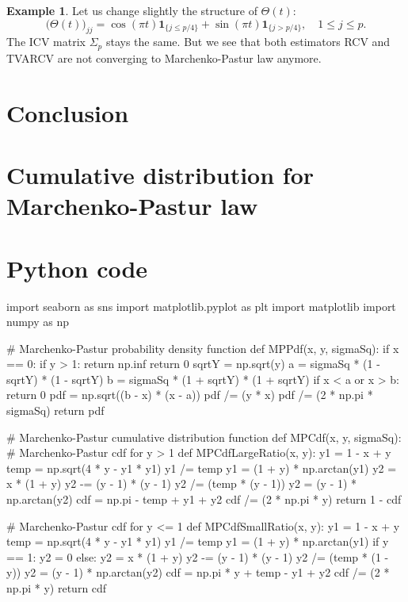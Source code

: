 \documentclass[a4paper,11pt]{article}
\theoremstyle{plain}
\theoremstyle{definition}
\newtheorem{exmp}[thm]{Example}
\begin{document}
    \begin{exmp}
    	Let us change slightly the structure of $\Theta(t)$:
    	\[ \Big(\Theta(t)\Big)_{jj} = \cos(\pi t) \mathbf{1}_{\{j \leq p/4\}} + \sin(\pi t) \mathbf{1}_{\{j > p/4\}}, \quad 1 \leq j \leq p.\]
    	The ICV matrix $\Sigma_p$ stays the same. But we see that both estimators RCV and TVARCV are not converging to Marchenko-Pastur law anymore.
    \end{exmp}
    
    \pagebreak
    \part{Conclusion}
    
    \pagebreak
    \begin{appendices}
    	\part*{Cumulative distribution for Marchenko-Pastur law}
    	
    	\pagebreak
    	\part*{Python code}
    	\begin{python}
import seaborn as sns
import matplotlib.pyplot as plt
import matplotlib
import numpy as np  
  		
    		
# Marchenko-Pastur probability density function
def MPPdf(x, y, sigmaSq):
    if x == 0:
        if y > 1:
            return np.inf
        return 0
    sqrtY = np.sqrt(y)
    a = sigmaSq * (1 - sqrtY) * (1 - sqrtY)
    b = sigmaSq * (1 + sqrtY) * (1 + sqrtY)
    if x < a or x > b:
        return 0
    pdf = np.sqrt((b - x) * (x - a))
    pdf /= (y * x)
    pdf /= (2 * np.pi * sigmaSq)
    return pdf


# Marchenko-Pastur cumulative distribution function
def MPCdf(x, y, sigmaSq):
    # Marchenko-Pastur cdf for y > 1
    def MPCdfLargeRatio(x, y):
        y1 = 1 - x + y
        temp = np.sqrt(4 * y - y1 * y1)
        y1 /= temp
        y1 = (1 + y) * np.arctan(y1)
        y2 = x * (1 + y)
        y2 -= (y - 1) * (y - 1)
        y2 /= (temp * (y - 1))
        y2 = (y - 1) * np.arctan(y2)
        cdf = np.pi - temp + y1 + y2
        cdf /= (2 * np.pi * y)
        return 1 - cdf

    # Marchenko-Pastur cdf for y <= 1
    def MPCdfSmallRatio(x, y):
        y1 = 1 - x + y
        temp = np.sqrt(4 * y - y1 * y1)
        y1 /= temp
        y1 = (1 + y) * np.arctan(y1)
        if y == 1:
            y2 = 0
        else:
            y2 = x * (1 + y)
            y2 -= (y - 1) * (y - 1)
            y2 /= (temp * (1 - y))
            y2 = (y - 1) * np.arctan(y2)
        cdf = np.pi * y + temp - y1 + y2
        cdf /= (2 * np.pi * y)
        return cdf


\end{python}
\end{appendices}
\end{document}
